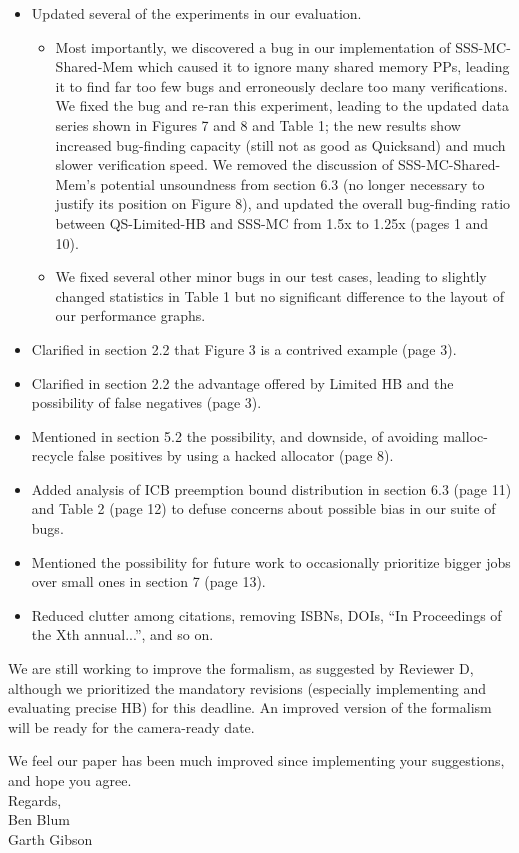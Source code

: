 \documentclass{article}
\begin{document}
\begin{itemize}
	\item Updated several of the experiments in our evaluation.
		\begin{itemize}
			\item Most importantly, we discovered a bug in our implementation of SSS-MC-Shared-Mem which caused it to ignore many shared memory PPs, leading it to find far too few bugs and erroneously declare too many verifications.
		We fixed the bug and re-ran this experiment, leading to the updated data series shown in Figures 7 and 8 and Table 1;
		the new results show increased bug-finding capacity (still not as good as Quicksand) and much slower verification speed.
		We removed the discussion of SSS-MC-Shared-Mem's potential unsoundness from section 6.3 (no longer necessary to justify its position on Figure 8),
		and updated the overall bug-finding ratio between QS-Limited-HB and SSS-MC from 1.5x to 1.25x (pages 1 and 10).
			\item We fixed several other minor bugs in our test cases, leading to slightly changed statistics in Table 1 but no significant difference to the layout of our performance graphs.
		\end{itemize}
	\item Clarified in section 2.2 that Figure 3 is a contrived example (page 3).
	\item Clarified in section 2.2 the advantage offered by Limited HB and the possibility of false negatives (page 3).
	\item Mentioned in section 5.2 the possibility, and downside, of avoiding malloc-recycle false positives by using a hacked allocator (page 8).
	\item Added analysis of ICB preemption bound distribution in section 6.3 (page 11) and Table 2 (page 12) to defuse concerns about possible bias in our suite of bugs.
	\item Mentioned the possibility for future work to occasionally prioritize bigger jobs over small ones in section 7 (page 13).
	\item Reduced clutter among citations, removing ISBNs, DOIs, ``In Proceedings of the Xth annual...'', and so on.
\end{itemize}

We are still working to improve the formalism, as suggested by Reviewer D,
although we prioritized the mandatory revisions (especially implementing and evaluating precise HB) for this deadline.
An improved version of the formalism will be ready for the camera-ready date.

We feel our paper has been much improved since implementing your suggestions, and hope you agree.
\\

\noindent Regards,
\\

\noindent Ben Blum \\
Garth Gibson
\end{document}

